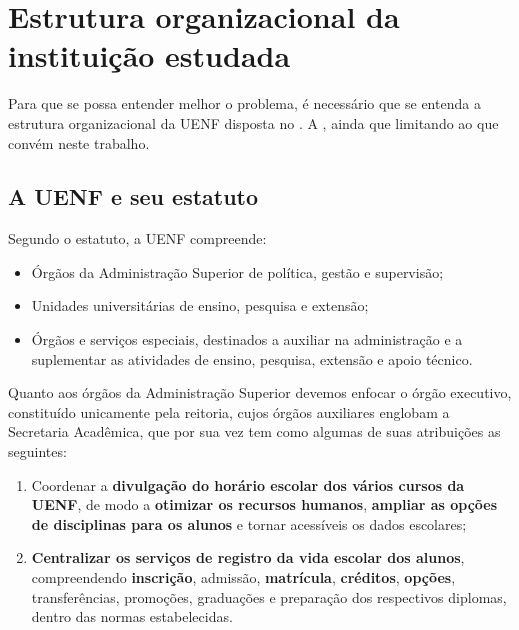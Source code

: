 \chapter[Estrutura]{Estrutura organizacional da instituição estudada} \label{chap:instituicao}

Para que se possa entender melhor o problema, é necessário que se entenda a estrutura organizacional da UENF disposta no . A , ainda que limitando ao que convém neste trabalho.

\section{A UENF e seu estatuto} %


Segundo o estatuto, a UENF compreende:

\begin{itemize}
  \item Órgãos da Administração Superior de política, gestão e supervisão;
  \item Unidades universitárias de ensino, pesquisa e extensão;
  \item Órgãos e serviços especiais, destinados a auxiliar na administração e a suplementar as atividades de ensino, pesquisa, extensão e apoio técnico.
\end{itemize}


Quanto aos órgãos da Administração Superior devemos enfocar o órgão executivo, constituído unicamente pela reitoria, cujos órgãos auxiliares englobam a Secretaria Acadêmica, que por sua vez tem como algumas de suas atribuições as seguintes:

\begin{enumerate}
  \item Coordenar a \textbf{divulgação do horário escolar dos vários cursos da UENF}, de modo a \textbf{otimizar os recursos humanos}, \textbf{ampliar as opções de disciplinas para os alunos} e tornar acessíveis os dados escolares;
  \item \textbf{Centralizar os serviços de registro da vida escolar dos alunos}, compreendendo \textbf{inscrição}, admissão, \textbf{matrícula}, \textbf{créditos}, \textbf{opções}, transferências, promoções, graduações e preparação dos respectivos diplomas, dentro das normas estabelecidas.
\end{enumerate}

